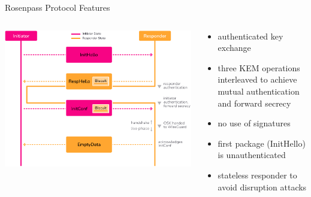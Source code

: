 \begin{frame}{Rosenpass Protocol Features}
  \begin{columns}[fullwidth,c]
    \begin{column}{.6\linewidth}
      \includegraphics[width=\linewidth]{graphics/rosenpass-wp-key-exchange-protocol-rgb.pdf}
    \end{column}

    \begin{column}{.4\linewidth}
      \begin{itemize}
        \item authenticated key exchange
        \item three KEM operations interleaved to achieve mutual authentication and forward secrecy
        \item no use of signatures
        \item first package (InitHello) is unauthenticated
        \item stateless responder to avoid disruption attacks
      \end{itemize}
    \end{column}
  \end{columns}
\end{frame}
